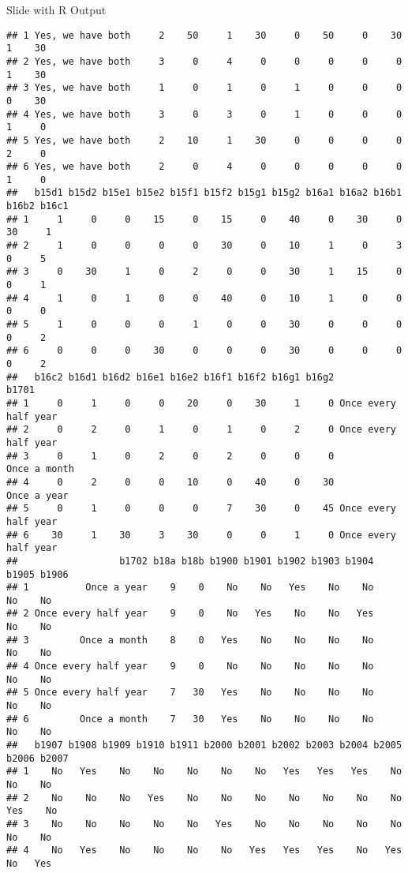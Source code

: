 \documentclass[
  ignorenonframetext,
]{beamer}
\begin{document}
\begin{frame}[fragile]{Slide with R Output}
\begin{verbatim}
## 1 Yes, we have both     2    50     1    30     0    50     0    30     1    30
## 2 Yes, we have both     3     0     4     0     0     0     0     0     1    30
## 3 Yes, we have both     1     0     1     0     1     0     0     0     0    30
## 4 Yes, we have both     3     0     3     0     1     0     0     0     1     0
## 5 Yes, we have both     2    10     1    30     0     0     0     0     2     0
## 6 Yes, we have both     2     0     4     0     0     0     0     0     1     0
##   b15d1 b15d2 b15e1 b15e2 b15f1 b15f2 b15g1 b15g2 b16a1 b16a2 b16b1 b16b2 b16c1
## 1     1     0     0    15     0    15     0    40     0    30     0    30     1
## 2     1     0     0     0     0    30     0    10     1     0     3     0     5
## 3     0    30     1     0     2     0     0    30     1    15     0     0     1
## 4     1     0     1     0     0    40     0    10     1     0     0     0     0
## 5     1     0     0     0     1     0     0    30     0     0     0     0     2
## 6     0     0     0    30     0     0     0    30     0     0     0     0     2
##   b16c2 b16d1 b16d2 b16e1 b16e2 b16f1 b16f2 b16g1 b16g2                b1701
## 1     0     1     0     0    20     0    30     1     0 Once every half year
## 2     0     2     0     1     0     1     0     2     0 Once every half year
## 3     0     1     0     2     0     2     0     0     0         Once a month
## 4     0     2     0     0    10     0    40     0    30          Once a year
## 5     0     1     0     0     0     7    30     0    45 Once every half year
## 6    30     1    30     3    30     0     0     1     0 Once every half year
##                  b1702 b18a b18b b1900 b1901 b1902 b1903 b1904 b1905 b1906
## 1          Once a year    9    0    No    No   Yes    No    No    No    No
## 2 Once every half year    9    0    No   Yes    No    No   Yes    No    No
## 3         Once a month    8    0   Yes    No    No    No    No    No    No
## 4 Once every half year    9    0    No    No    No    No    No    No    No
## 5 Once every half year    7   30   Yes    No    No    No    No    No    No
## 6         Once a month    7   30   Yes    No    No    No    No    No    No
##   b1907 b1908 b1909 b1910 b1911 b2000 b2001 b2002 b2003 b2004 b2005 b2006 b2007
## 1    No   Yes    No    No    No    No    No   Yes   Yes   Yes    No    No    No
## 2    No    No    No   Yes    No    No    No    No    No    No    No   Yes    No
## 3    No    No    No    No    No   Yes    No    No    No    No    No    No    No
## 4    No   Yes    No    No    No    No   Yes   Yes   Yes    No   Yes    No   Yes

\end{verbatim}
\end{frame}
\end{document}
